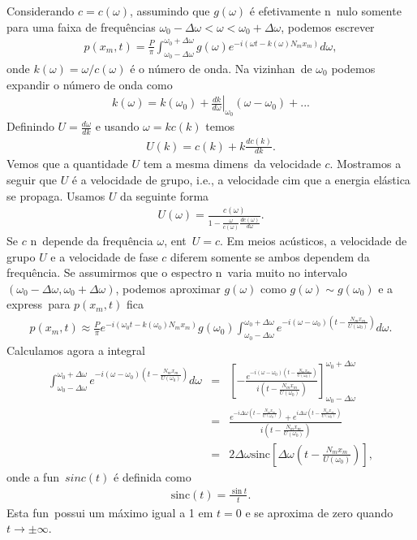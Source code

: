 Considerando $c = c(\omega)$, assumindo que $g(\omega)$ \'e efetivamente
n\ao\ nulo somente para uma faixa de frequ\^encias $\omega_0 -
\Delta\omega < \omega < \omega_0 + \Delta\omega$, podemos escrever
\begin{eqnarray}
p(x_m,t) = \frac{P}{\pi}\int_{\omega_0 - \Delta\omega}^{\omega_0 + \Delta\omega}
g(\omega)e^{-i(\omega t - k(\omega)N_m x_m)}d\omega,
\end{eqnarray}
onde $k(\omega) = \omega/c(\omega)$ \'e o n\'umero de onda. Na
vizinhan\ca\ de $\omega_0$ podemos expandir o n\'umero de onda como
\begin{eqnarray}
k(\omega) = k(\omega_0) + \left.\frac{dk}{d\omega}\right|_{\omega_0}(\omega - \omega_0) + ...
\end{eqnarray}
Definindo $U = \frac{d\omega}{dk}$ e usando $\omega = kc(k)$ temos
\begin{eqnarray}
U(k) = c(k) + k\frac{dc(k)}{dk}.
\end{eqnarray} 
Vemos que a quantidade $U$ tem a mesma dimens\ao\ da velocidade $c$.
Mostramos a seguir que $U$ \'e a velocidade de grupo, i.e., a velocidade
cim que a energia el\'astica se propaga. Usamos $U$ da seguinte forma
\begin{eqnarray}
U(\omega) = \frac{c(\omega)}{1 - \frac{\omega}{c(\omega)}\frac{dc(\omega)}{d\omega}}.
\end{eqnarray}
Se $c$ n\ao\ depende da frequ\^encia $\omega$, ent\ao\ $U = c$. Em meios
ac\'usticos, a velocidade de grupo $U$ e a velocidade de fase $c$
diferem somente se ambos dependem da frequ\^encia. Se assumirmos que o
espectro n\ao\ varia muito no intervalo $(\omega_0 -
\Delta\omega,\omega_0 + \Delta\omega)$, podemos aproximar $g(\omega)$
como $g(\omega) \sim g(\omega_0)$ e a express\ao\ para $p(x_m,t)$ fica
\begin{eqnarray}
p(x_m,t) \approx \frac{P}{\pi}e^{-i(\omega_0 t - k(\omega_0)N_m x_m)}g(\omega_0)
\int_{\omega_0 - \Delta\omega}^{\omega_0 + \Delta\omega}
e^{-i(\omega - \omega_0)(t - \frac{N_m x_m}{U(\omega_0)})}d\omega.
\end{eqnarray}
Calculamos agora a integral
\begin{eqnarray}
\int_{\omega_0 - \Delta\omega}^{\omega_0 + \Delta\omega}e^{-i(\omega - \omega_0)(t - \frac{N_m x_m}{U(\omega_0)})}d\omega &=&
\left[- \frac{e^{-i(\omega - \omega_0)(t - \frac{N_m x_m}{U(\omega_0)})}}{i(t - \frac{N_m x_m}{U(\omega_0)})} 
\right]_{\omega_0 - \Delta\omega}^{\omega_0 + \Delta\omega} \nonumber\\
&=& \frac{e^{-i\Delta\omega(t - \frac{N_m x_m}{U(\omega_0)})} + e^{i\Delta\omega(t - 
\frac{N_m x_m}{U(\omega_0)})}}{i(t - \frac{N_m x_m}{U(\omega_0)})} \nonumber\\
&=& 2\Delta\omega \mbox{sinc}\left[\Delta\omega\left(t - \frac{N_m x_m}{U(\omega_0)} \right) \right],
\end{eqnarray}
onde a fun\cao\ $sinc(t)$ \'e definida como
\begin{eqnarray}
\mbox{sinc}(t) = \frac{\sin t}{t}.
\end{eqnarray}
Esta fun\cao\ possui um m\'aximo igual a 1 em $t=0$ e se aproxima de
zero quando $t \longrightarrow \pm \infty$.

